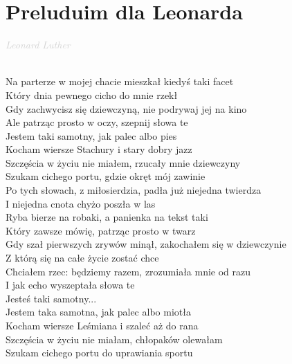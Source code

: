 \documentclass[a5paper, 10pt]{book}
\begin{document}
\section{Preluduim dla Leonarda}\textcolor{lightgray}{\textit{Leonard Luther}}\\~\\
\begin{minipage}[t]{0.81\textwidth}
Na parterze w mojej chacie mieszkał kiedyś taki facet\\
Który dnia pewnego cicho do mnie rzekł\\
Gdy zachwycisz się dziewczyną, nie podrywaj jej na kino\\
Ale patrząc prosto w oczy, szepnij słowa te\\

\hspace*{4mm}Jestem taki samotny, jak palec albo pies\\
\hspace*{4mm}Kocham wiersze Stachury i stary dobry jazz\\
\hspace*{4mm}Szczęścia w życiu nie miałem, rzucały mnie dziewczyny\\
\hspace*{4mm}Szukam cichego portu, gdzie okręt mój zawinie\\

Po tych słowach, z miłosierdzia, padła już niejedna twierdza\\
I niejedna cnota chyżo poszła w las\\
Ryba bierze na robaki, a panienka na tekst taki\\
Który zawsze mówię, patrząc prosto w twarz\\

Gdy szał pierwszych zrywów minął, zakochałem się w dziewczynie \\
Z którą się na całe życie zostać chce\\
Chciałem rzec: będziemy razem, zrozumiała mnie od razu\\
I jak echo wyszeptała słowa te\\

\hspace*{4mm}Jesteś taki samotny...\\

\hspace*{4mm}Jestem taka samotna, jak palec albo miotła\\
\hspace*{4mm}Kocham wiersze Leśmiana i szaleć aż do rana\\
\hspace*{4mm}Szczęścia w życiu nie miałam, chłopaków olewałam\\
\hspace*{4mm}Szukam cichego portu do uprawiania sportu\\
\end{minipage}
\end{document}
